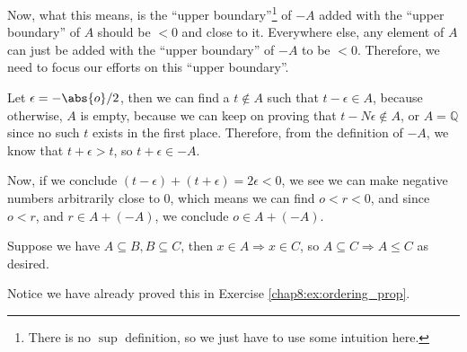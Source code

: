 {{Now, what this means, is the ``upper boundary''\footnote{
  There is no $\sup$ definition, so we just have to use some intuition here.
} of $-A$
added with the ``upper boundary'' of $A$ should be $< 0$ 
and close to it. Everywhere else, any element of $A$
can just be added with the ``upper boundary'' of $-A$
to be $< 0$.
Therefore, we need to focus our efforts on this ``upper boundary''.

Let $\epsilon = -\abs{o}/2$, then
we can find a $t \not\in A$ such that $t - \epsilon \in A$,
because otherwise, $A$ is empty, because we can keep on proving that 
$t - N\epsilon \not\in A$,
or $A = \mathbb{Q}$ since no such $t$ exists in the first place. 
Therefore, from the definition of $-A$, we know that $t + \epsilon > t$,
so $t + \epsilon \in -A$.

Now, if we conclude $(t-\epsilon) + (t+\epsilon) = 2\epsilon < 0$,
we see we can make negative numbers arbitrarily close to $0$,
which means we can find $o < r < 0$, and since $o < r$, and $r \in A+(-A)$,
we conclude $o \in A+(-A)$.

\item Suppose we have $A \subseteq B, B \subseteq C$,
then $x \in A \Rightarrow x \in C$, so $A \subseteq C \Rightarrow A \leq C$
as desired. 

Notice we have already proved this in Exercise
\ref{chap8:ex:ordering_prop}.
}
}

